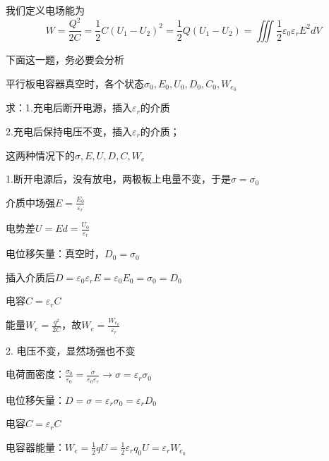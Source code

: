 \documentclass[lang=cn,10pt]{elegantbook}
\begin{document}
		\subsection{\color{red}}
		\begin{definition}
			我们定义电场能为
			\begin{equation*}
				W=\frac{Q^{2}}{2C}=\frac{1}{2}C(U_{1}-U_{2})^{2}=\frac{1}{2}Q(U_{1}-U_{2})=\iiint{\frac{1}{2}\varepsilon _0\varepsilon _rE^2dV}
			\end{equation*}
		\end{definition}
		下面这一题，务必要会分析
		\begin{example}
			平行板电容器真空时，各个状态$\sigma_{0},E_{0},U_{0},D_{0},C_{0},W_{e_{0}} $
			
			求：1.充电后断开电源，插入$\varepsilon_{r}$的介质
			
			2.充电后保持电压不变，插入$\varepsilon_{r}$的介质；
			
			这两种情况下的$\sigma,E,U,D,C,W_{e} $
		\end{example}
		\begin{solution}
			1.断开电源后，没有放电，两极板上电量不变，于是$\sigma=\sigma_{0}$
			
			介质中场强$E=\frac{E_{0}}{\varepsilon_{r}}$
			
			电势差$U=Ed=\frac{U_{0}}{\varepsilon_{r}}$
			
			电位移矢量：真空时，$D_{0}=\sigma_{0}$
			
			插入介质后$D=\varepsilon_{0}\varepsilon_{r}E=\varepsilon_{0}E_{0}=\sigma_{0}=D_{0}$
			
			电容$C=\varepsilon_{r}C$
			
			能量$W_{e}=\frac{q^{2}}{2C}$，故$W_{e}=\frac{W_{e_{0}}}{\varepsilon_{r}}$
			
			2.
			电压不变，显然场强也不变
			
			电荷面密度：$\frac{\sigma _0}{\varepsilon _0}=\frac{\sigma}{\varepsilon _0\varepsilon _r}\rightarrow \sigma =\varepsilon _r\sigma _0$
			
			电位移矢量：$D=\sigma =\varepsilon _r\sigma _0=\varepsilon _rD_0$
			
			电容$C=\varepsilon_{r}C$
			
			电容器能量：$W_e=\frac{1}{2}qU=\frac{1}{2}\varepsilon _rq_0U=\varepsilon _rW_{e_0}$
		\end{solution}
\end{document}
